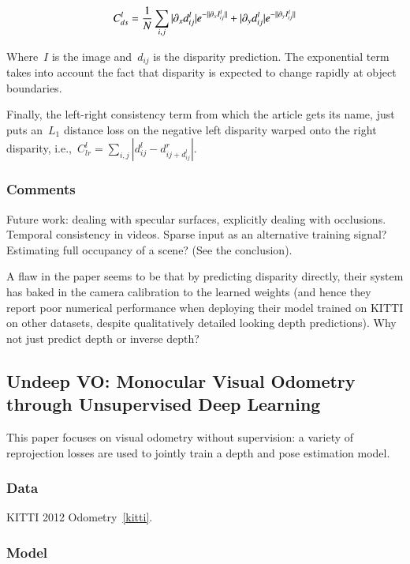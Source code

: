 \documentclass[a4paper, 12pt]{article}
\DeclarePairedDelimiter\norm{\lVert}{\rVert}%
\begin{document}
\begin{equation*}
        C_{ds}^l = \frac{1}{N} \sum_{i, j}
                |\partial_x d_{ij}^l|e^{-\norm{\partial_x I_{ij}^l}} +
                |\partial_y d_{ij}^l|e^{-\norm{\partial_y I_{ij}^l}}
\end{equation*}

Where~$I$ is the image and~$d_{ij}$ is the disparity prediction. The
exponential term takes into account the fact that disparity is expected to
change rapidly at object boundaries.

Finally, the left-right consistency term from which the article gets its name,
just puts an~$L_1$ distance loss on the negative left disparity warped onto the
right disparity,
i.e.,~$C_{lr}^l = \sum_{i, j} |d_{ij}^l - d_{ij + d_{ij}^l}^r|$.


\subsubsection{Comments}

Future work: dealing with specular surfaces, explicitly dealing with
occlusions. Temporal consistency in videos. Sparse input as an alternative
training signal? Estimating full occupancy of a scene? (See the conclusion).

A flaw in the paper seems to be that by predicting disparity directly, their
system has baked in the camera calibration to the learned weights (and hence
they report poor numerical performance when deploying their model trained on
KITTI on other datasets, despite qualitatively detailed looking depth
predictions). Why not just predict depth or inverse depth?


\subsection{Undeep VO\@: Monocular Visual Odometry through Unsupervised Deep
            Learning~\citet{li-undeep-vo-2017}}

This paper focuses on visual odometry without supervision: a variety of
reprojection losses are used to jointly train a depth and pose estimation
model.


\subsubsection{Data}

KITTI 2012 Odometry~\ref{kitti}.


\subsubsection{Model}
\end{document}
